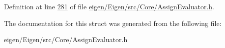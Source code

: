 Definition at line \hyperlink{eigen_2_eigen_2src_2_core_2_assign_evaluator_8h_source_l00281}{281} of file \hyperlink{eigen_2_eigen_2src_2_core_2_assign_evaluator_8h_source}{eigen/\+Eigen/src/\+Core/\+Assign\+Evaluator.\+h}.



The documentation for this struct was generated from the following file\+:\begin{DoxyCompactItemize}
\item 
eigen/\+Eigen/src/\+Core/\+Assign\+Evaluator.\+h\end{DoxyCompactItemize}
